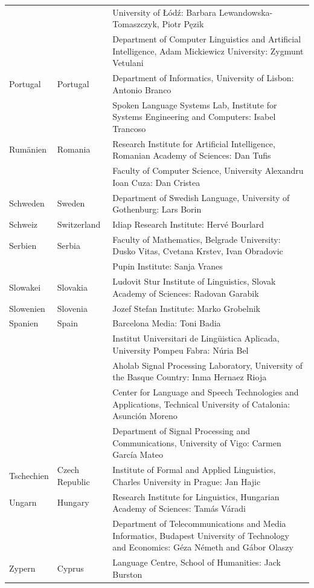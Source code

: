 \documentclass[]{../../metanetpaper}
\begin{document}
\begin{Parallel}[c]{79mm}{78mm}
\begin{longtable}{@{}llp{105mm}@{}}
& & University of Łódź: Barbara Lewandowska-Tomaszczyk, Piotr Pęzik\\ \addlinespace
& & Department of Computer Linguistics and Artificial Intelligence, Adam Mickiewicz University: Zygmunt Vetulani \\ \addlinespace
Portugal & Portugal & Department of Informatics, University of Lisbon: Antonio Branco\\ \addlinespace
& & Spoken Language Systems Lab, Institute for Systems Engineering and Computers: Isabel Trancoso \\ \addlinespace
Rumänien & Romania & Research Institute for Artificial Intelligence, Romanian Academy of Sciences: Dan Tufis \\ \addlinespace
& & Faculty of Computer Science, University Alexandru Ioan Cuza: Dan Cristea \\ \addlinespace
Schweden & Sweden & Department of Swedish Language, University of Gothenburg: Lars Borin \\ \addlinespace 
Schweiz & Switzerland & Idiap Research Institute: Hervé Bourlard \\ \addlinespace 
Serbien & Serbia & Faculty of Mathematics, Belgrade University: Dusko Vitas, Cvetana Krstev, Ivan Obradovic \\ \addlinespace
& & Pupin Institute: Sanja Vranes \\ \addlinespace  
Slowakei & Slovakia & Ludovit Stur Institute of Linguistics, Slovak Academy of Sciences: Radovan Garabik \\ \addlinespace 
Slowenien & Slovenia & Jozef Stefan Institute: Marko Grobelnik \\ \addlinespace 
Spanien & Spain & Barcelona Media: Toni Badia \\ \addlinespace 
& & Institut Universitari de Lingüistica Aplicada, University Pompeu Fabra: Núria Bel \\ \addlinespace 
& & Aholab Signal Processing Laboratory, University of the Basque Country: Inma Hernaez Rioja \\ \addlinespace 
& & Center for Language and Speech Technologies and Applications, Technical University of Catalonia: Asunción Moreno \\ \addlinespace 
& & Department of Signal Processing and Communications, University of Vigo: Carmen García Mateo \\ \addlinespace 
Tschechien & Czech Republic & Institute of Formal and Applied Linguistics, Charles University in Prague: Jan Hajic \\ \addlinespace
Ungarn & Hungary & Research Institute for Linguistics, Hungarian Academy of Sciences: Tamás Váradi\\  \addlinespace
& & Department of Telecommunications and Media Informatics, Budapest University of Technology and Economics: Géza Németh and Gábor Olaszy\\ \addlinespace
Zypern & Cyprus & Language Centre, School of Humanities: Jack Burston
 \end{longtable}


\end{Parallel}
\end{document}
